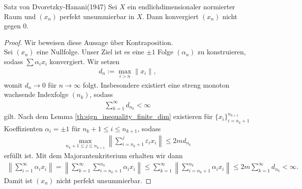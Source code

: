 \begin{genericthm}{Satz von Dvoretzky-Hanani(1947)}\label{th:dvoretzkey_hanani}
	Sei $ X $ ein endlichdimensionaler normierter Raum und $ (x_n) $ perfekt unsummierbar in $ X $.
	Dann konvergiert $ (x_n) $ nicht gegen $ 0 $.
\end{genericthm}
\begin{proof}
	Wir beweisen diese Aussage über Kontraposition.\\
	Sei $ (x_n) $ eine Nullfolge.
	Unser Ziel ist es eine $ \pm 1 $ Folge  $ (\alpha_n) $ zu konstruieren, sodass
	$ \sum \alpha_i x_i $ konvergiert.
	Wir setzen
	\begin{align*}
		d_n := \max \limits_{i > n}  \| x_i \|,
	\end{align*}
	womit $ d_n \to 0  $ für $ n \to \infty $ folgt.
	Insbesondere existiert eine streng monoton wachsende Indexfolge $ (n_k) $, sodass
	\begin{align*}
		\sum \limits_{k = 1 }^\infty d_{n_k } < \infty
	\end{align*}
	gilt. 
	Nach dem Lemma \ref{th:sign_inequality_finite_dim} existieren für $ \{ x_i \}_{i = n_k +1 }^{n_{k+1}} $ Koeffizienten $ \alpha_i = \pm 1 $ für $ n_k +1 \leq i \leq n_{k+1} $, sodass
	\begin{align*}
		\max \limits_{n_k + 1 \leq j \leq n_{k+1} }
		\left\|
		\sum 
		\limits_{i = n_k +1 }^j
		\varepsilon_i  x_i 
		\right\|
		\leq 2m d_{n_k}
	\end{align*}
	erfüllt ist.
	Mit dem Majorantenkriterium erhalten wir dann
	\begin{align*}
		\left\|
		\sum \limits_{i = 1 }^\infty \alpha_i x_i 
		\right\| 
		=
		\left\|
		\sum \limits_{k = 1 }^\infty \sum \limits_{i = n_k +1 }^{n_k} \alpha_i x_i 
		\right\| 
		\leq
		\sum \limits_{k = 1 }^\infty \left\| \sum \limits_{i = n_k +1 }^{n_k} \alpha_i x_i \right\|
		\leq
		2m \sum \limits_{k = 1 }^\infty d_{n_k } < \infty.
	\end{align*}
	Damit ist $ (x_n) $ nicht perfekt unsummierbar.
\end{proof}

